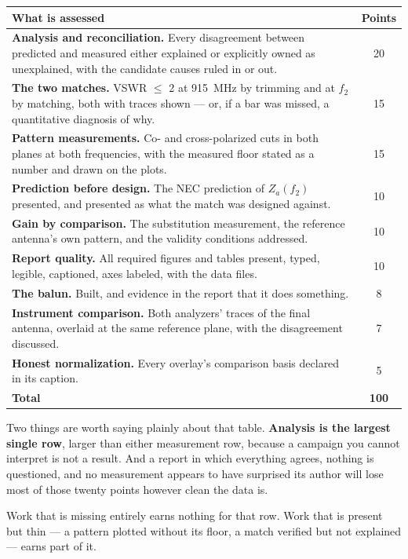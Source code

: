 \documentclass{exam}
\def\fOne{915}
\begin{document}
\begin{center}
\begin{tabular}{|p{4.6in}|c|}
\hline
\textbf{What is assessed} & \textbf{Points} \\
\hline
\textbf{Analysis and reconciliation.} Every disagreement between predicted and
measured either explained or explicitly owned as unexplained, with the
candidate causes ruled in or out. & 20 \\
\hline
\textbf{The two matches.} VSWR $\le$ 2 at \fOne\ MHz by trimming and at $f_2$
by matching, both with traces shown --- or, if a bar was missed, a quantitative
diagnosis of why. & 15 \\
\hline
\textbf{Pattern measurements.} Co- and cross-polarized cuts in both planes at
both frequencies, with the measured floor stated as a number and drawn on the
plots. & 15 \\
\hline
\textbf{Prediction before design.} The NEC prediction of $Z_a(f_2)$ presented,
and presented as what the match was designed against. & 10 \\
\hline
\textbf{Gain by comparison.} The substitution measurement, the reference
antenna's own pattern, and the validity conditions addressed. & 10 \\
\hline
\textbf{Report quality.} All required figures and tables present, typed,
legible, captioned, axes labeled, with the data files. & 10 \\
\hline
\textbf{The balun.} Built, and evidence in the report that it does
something. & 8 \\
\hline
\textbf{Instrument comparison.} Both analyzers' traces of the final antenna,
overlaid at the same reference plane, with the disagreement discussed. & 7 \\
\hline
\textbf{Honest normalization.} Every overlay's comparison basis declared in
its caption. & 5 \\
\hline
\textbf{Total} & \textbf{100} \\
\hline
\end{tabular}
\end{center}

Two things are worth saying plainly about that table. \textbf{Analysis is the
largest single row}, larger than either measurement row, because a campaign
you cannot interpret is not a result. And a report in which everything agrees,
nothing is questioned, and no measurement appears to have surprised its author
will lose most of those twenty points however clean the data is.

Work that is missing entirely earns nothing for that row. Work that is present
but thin --- a pattern plotted without its floor, a match verified but not
explained --- earns part of it.
\end{document}
